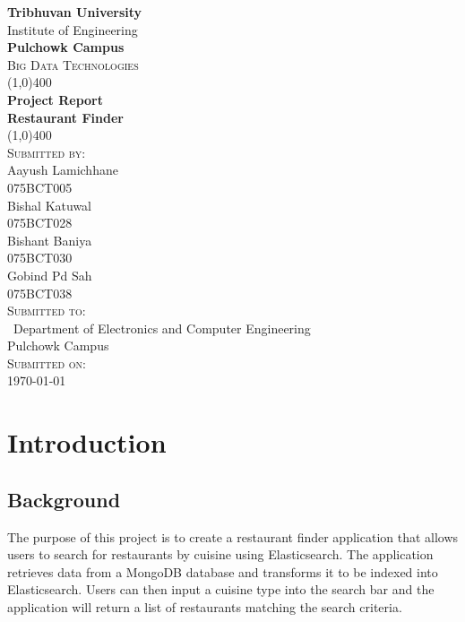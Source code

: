 \documentclass[12pt]{article}
\begin{document}
\begin{titlepage}
    \begin{center}
        \huge{\bfseries  Tribhuvan University}\\
        \Large{Institute of Engineering}\\
        \huge{ \bfseries  Pulchowk Campus}\\[3.2cm]


        \textsc{\Large Big Data Technologies}\\[-0.5cm]
        \line(1,0){400}\\
        \huge{\bfseries Project Report}\\
        \Large{\bfseries Restaurant Finder\\}
        \line(1,0){400}\\


        \textsc{\Large Submitted by:}\\
        \Large Aayush Lamichhane\\ \large 075BCT005\\    [0.85cm]
        \Large Bishal Katuwal\\ \large 075BCT028\\    [0.85cm]
        \Large Bishant Baniya\\ \large 075BCT030\\    [0.85cm]
        \Large Gobind Pd Sah\\ \large 075BCT038\\    [0.85cm]


        \textsc{\Large Submitted to:}\\\
        \large Department of Electronics and Computer Engineering\\Pulchowk Campus\\    [0.85cm]
        
        \textsc{\Large Submitted on:}\\
        \today
        
    \end{center}
\end{titlepage}
\pagebreak
\tableofcontents
\pagebreak
\listoffigures
\pagebreak
\listoftables
\pagebreak
\section{Introduction}
\subsection{Background}
The purpose of this project is to create a restaurant finder application that allows users to search for restaurants by cuisine using Elasticsearch. The application retrieves data from a MongoDB database and transforms it to be indexed into Elasticsearch. Users can then input a cuisine type into the search bar and the application will return a list of restaurants matching the search criteria.
\end{document}
